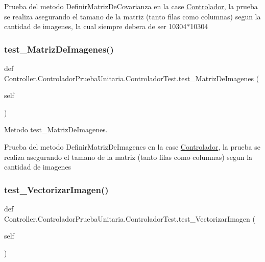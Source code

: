 Prueba del metodo Definir\+Matriz\+De\+Covarianza en la case \hyperlink{namespace_controller_1_1_controlador}{Controlador}, la prueba se realiza asegurando el tamano de la matriz (tanto filas como columnas) segun la cantidad de imagenes, la cual siempre debera de ser 10304$\ast$10304 \mbox{\label{class_controller_1_1_controlador_prueba_unitaria_1_1_controlador_test_a149c2fe8732cf438622aefdfad75dd4a}} 
\subsubsection{\texorpdfstring{test\+\_\+\+Matriz\+De\+Imagenes()}{test\_MatrizDeImagenes()}}
{\footnotesize\ttfamily def Controller.\+Controlador\+Prueba\+Unitaria.\+Controlador\+Test.\+test\+\_\+\+Matriz\+De\+Imagenes (\begin{DoxyParamCaption}\item[{}]{self }\end{DoxyParamCaption})}



Metodo test\+\_\+\+Matriz\+De\+Imagenes. 

Prueba del metodo Definir\+Matriz\+De\+Imagenes en la case \hyperlink{namespace_controller_1_1_controlador}{Controlador}, la prueba se realiza asegurando el tamano de la matriz (tanto filas como columnas) segun la cantidad de imagenes \mbox{\label{class_controller_1_1_controlador_prueba_unitaria_1_1_controlador_test_ab91d55bbbbfb2b11399063e00460fed6}} 
\subsubsection{\texorpdfstring{test\+\_\+\+Vectorizar\+Imagen()}{test\_VectorizarImagen()}}
{\footnotesize\ttfamily def Controller.\+Controlador\+Prueba\+Unitaria.\+Controlador\+Test.\+test\+\_\+\+Vectorizar\+Imagen (\begin{DoxyParamCaption}\item[{}]{self }\end{DoxyParamCaption})}



